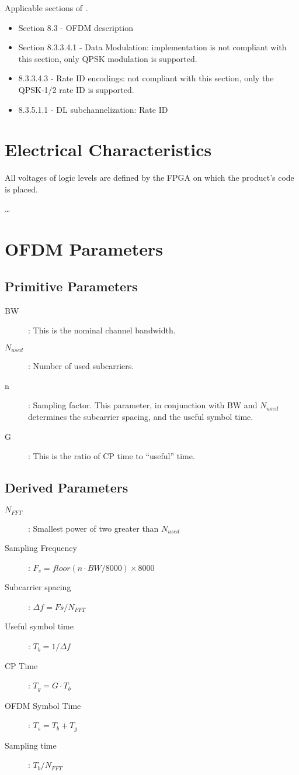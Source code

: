\documentclass[dvips,10pt,twocolumn]{article}
\begin{document}
	Applicable sections of \cite{IEEE:802.16}.
	\begin{itemize}
		\item Section 8.3 - OFDM description
		\item Section 8.3.3.4.1 - Data Modulation: implementation
			is not compliant with this section, only QPSK
			modulation is supported.
		\item 8.3.3.4.3 - Rate ID encodings: not compliant with
			this section, only the QPSK-1/2 rate ID is supported.
		\item 8.3.5.1.1 - DL subchannelization: Rate ID
	\end{itemize}

\section{Electrical Characteristics}
All voltages of logic levels are defined by the FPGA on which the product's
code is placed.

\ldots

\section{OFDM Parameters}

\subsection{Primitive Parameters}

\begin{description}
	\item[BW]: This is the nominal channel bandwidth.
	\item[$N_{used}$]: Number of used subcarriers.
	\item[n]: Sampling factor. This parameter, in conjunction with BW
		and $N_{used}$ determines the subcarrier spacing, and the
		useful symbol time.
	\item[G]: This is the ratio of CP time to ``useful'' time.
\end{description}



\subsection{Derived Parameters}

\begin{description}
	\item[$N_{FFT}$]: Smallest power of two greater than $N_{used}$
	\item[Sampling Frequency]: $F_s = floor ( n \cdot BW / 8000 )
		\times 8000 $
	\item[Subcarrier spacing]: $\Delta f = F s / N_{FFT} $
	\item[Useful symbol time]: $T_b = 1 / \Delta f$
	\item[CP Time]: $T_g = G \cdot T_b$
	\item[OFDM Symbol Time]: $T_s = T_b + T_g$
	\item[Sampling time]: $T_b / N_{FFT}$
\end{description}
\end{document}
